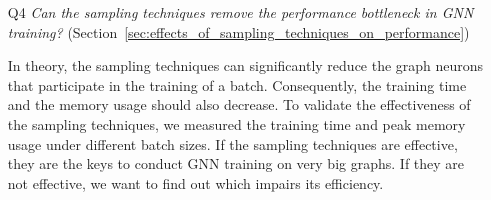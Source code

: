 \begin{itemize}
	\item[Q4] \emph{Can the sampling techniques remove the performance bottleneck in GNN training?} (Section~\ref{sec:effects_of_sampling_techniques_on_performance})
	
			In theory, the sampling techniques can significantly reduce the graph neurons that participate in the training of a batch.
			Consequently, the training time and the memory usage should also decrease.
			To validate the effectiveness of the sampling techniques, we measured the training time and peak memory usage under different batch sizes.
			If the sampling techniques are effective, they are the keys to conduct GNN training on very big graphs.
			If they are not effective, we want to find out which impairs its efficiency.
\end{itemize}

